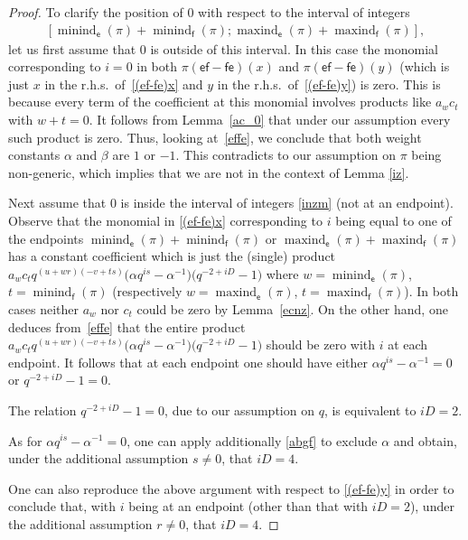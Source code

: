 \documentclass[pdftex]{sigma}
\numberwithin{equation}{section}
\begin{document}
\begin{proof} To clarify the position of $0$ with respect to the interval of integers
\begin{gather}\label{inzm}
[\operatorname{minind}_\mathsf{e}(\pi)+\operatorname{minind}_\mathsf{f}(\pi);\operatorname{maxind}_\mathsf{e}(\pi)+\operatorname{maxind}_\mathsf{f}(\pi)],
\end{gather}
let us first assume that $0$ is outside of this interval. In this case the monomial corresponding to $i=0$ in both $\pi(\mathsf{ef-fe})(x)$ and $\pi(\mathsf{ef-fe})(y)$ (which is just $x$ in the r.h.s.\ of~\eqref{(ef-fe)x} and $y$ in the r.h.s.\ of~\eqref{(ef-fe)y}) is zero. This is because every term of the coefficient at this monomial involves products like $a_wc_t$ with $w+t=0$. It follows from Lemma~\ref{ac_0} that under our assumption every such product is zero. Thus, looking at~\eqref{effe}, we conclude that both weight constants $\alpha$ and $\beta$ are $1$ or $-1$. This contradicts to our assumption on $\pi$ being non-generic, which implies that we are not in the context of Lemma \ref{iz}.

Next assume that $0$ is inside the interval of integers \eqref{inzm} (not at an endpoint). Observe that the monomial in \eqref{(ef-fe)x} corresponding to $i$ being equal to one of the endpoints $\operatorname{minind}_\mathsf{e}(\pi)+\operatorname{minind}_\mathsf{f}(\pi)$ or $\operatorname{maxind}_\mathsf{e}(\pi)+\operatorname{maxind}_\mathsf{f}(\pi)$ has a constant coefficient which is just the (single) product $a_wc_tq^{(u+wr)(-v+ts)}\big(\alpha q^{is}-\alpha^{-1}\big)\big(q^{-2+iD}-1\big)$ where $w=\operatorname{minind}_\mathsf{e}(\pi)$, $t=\operatorname{minind}_\mathsf{f}(\pi)$ (respectively $w=\operatorname{maxind}_\mathsf{e}(\pi)$, $t=\operatorname{maxind}_\mathsf{f}(\pi)$). In both cases neither $a_w$ nor $c_t$ could be zero by Lemma~\ref{ecnz}. On the other hand, one deduces from~\eqref{effe} that the entire product $a_wc_tq^{(u+wr)(-v+ts)}\big(\alpha q^{is}-\alpha^{-1}\big)\big(q^{-2+iD}-1\big)$ should be zero with $i$ at each endpoint. It follows that at each endpoint one should have either $\alpha q^{is}-\alpha^{-1}=0$ or $q^{-2+iD}-1=0$.

The relation $q^{-2+iD}-1=0$, due to our assumption on $q$, is equivalent to $iD=2$.

As for $\alpha q^{is}-\alpha^{-1}=0$, one can apply additionally \eqref{abgf} to exclude $\alpha$ and obtain, under the additional assumption $s\ne 0$, that $iD=4$.

One can also reproduce the above argument with respect to \eqref{(ef-fe)y} in order to conclude that, with $i$ being at an endpoint (other than that with $iD=2$), under the additional assumption $r\ne 0$, that $iD=4$.


\end{proof}
\end{document}
